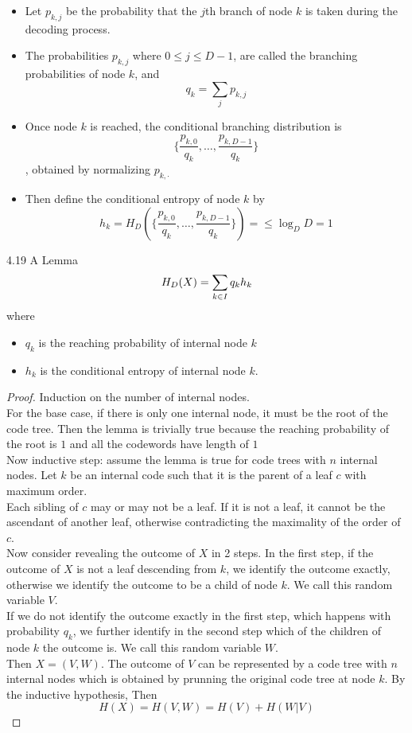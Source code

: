\documentclass[../main.tex]{subfiles}
\begin{document}
 \begin{itemize}
     \item Let $p_{k,j}$ be the probability that the $j$th branch of node $k$ is taken during the decoding process.
     \item The probabilities $p_{k,j}$ where $0\leq j\leq D-1$, are called the branching probabilities of node $k$, and \[
     q_k = \sum_j p_{k,j}
     \]
     \item Once node $k$ is reached, the conditional branching distribution is \[
     \{\frac{p_{k,0}}{q_k},\dots,\frac{p_{k,D-1}}{q_k}\}
     \],
     obtained by normalizing $p_{k,\cdot}$
     \item Then define the conditional entropy of node $k$ by \[
     h_k = H_D(\{\frac{p_{k,0}}{q_k},\dots,\frac{p_{k,D-1}}{q_k} \}) = \leq \log_D D = 1
     \]
 \end{itemize}
 \begin{bbox}{4.19 A Lemma}
     \[
     H_D(X)=\sum_{k\in I}q_k h_k
     \] where \begin{itemize}
         \item $q_k$ is the reaching probability of internal node $k$
         \item $h_k$ is the conditional entropy of internal node $k$.
     \end{itemize}
     \begin{proof}
         Induction on the number of internal nodes.\\
         For the base case, if there is only one internal node, it must be the root of the code tree. Then the lemma is trivially true because the reaching probability of the root is $1$ and all the codewords have length of $1$\\
         Now inductive step: assume the lemma is true for code trees with $n$ internal nodes. Let $k$ be an internal code such that it is the parent of a leaf $c$ with maximum order.\\
         Each sibling of $c$ may or may not be a leaf. If it is not a leaf, it cannot be the ascendant of another leaf, otherwise contradicting the maximality of the order of $c$. \\
         Now consider revealing the outcome of $X$ in 2 steps. In the first step, if the outcome of $X$ is not a leaf descending from $k$, we identify the outcome exactly, otherwise we identify the outcome to be a child of node $k$. We call this random variable $V$.\\
         If we do not identify the outcome exactly in the first step, which happens with probability $q_k$, we further identify in the second step which of the children of node $k$ the outcome is. We call this random variable $W$.\\
         Then $X=(V,W)$.
         The outcome of $V$ can be represented by a code tree with $n$ internal nodes which is obtained by prunning the original code tree at node $k$.
         By the inductive hypothesis, 
         Then \[
         H(X)=H(V,W)=H(V)+ H(W|V)
         \]
     \end{proof}
 \end{bbox}
\end{document}
